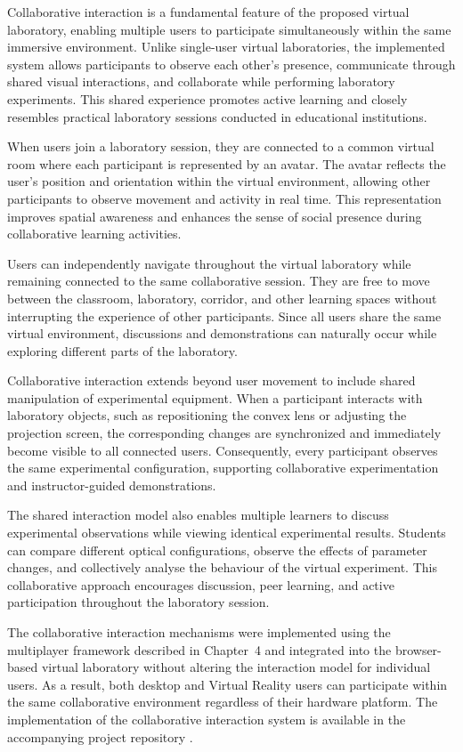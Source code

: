 Collaborative interaction is a fundamental feature of the proposed virtual laboratory, enabling multiple users to participate simultaneously within the same immersive environment. Unlike single-user virtual laboratories, the implemented system allows participants to observe each other's presence, communicate through shared visual interactions, and collaborate while performing laboratory experiments. This shared experience promotes active learning and closely resembles practical laboratory sessions conducted in educational institutions.

When users join a laboratory session, they are connected to a common virtual room where each participant is represented by an avatar. The avatar reflects the user's position and orientation within the virtual environment, allowing other participants to observe movement and activity in real time. This representation improves spatial awareness and enhances the sense of social presence during collaborative learning activities.

Users can independently navigate throughout the virtual laboratory while remaining connected to the same collaborative session. They are free to move between the classroom, laboratory, corridor, and other learning spaces without interrupting the experience of other participants. Since all users share the same virtual environment, discussions and demonstrations can naturally occur while exploring different parts of the laboratory.

Collaborative interaction extends beyond user movement to include shared manipulation of experimental equipment. When a participant interacts with laboratory objects, such as repositioning the convex lens or adjusting the projection screen, the corresponding changes are synchronized and immediately become visible to all connected users. Consequently, every participant observes the same experimental configuration, supporting collaborative experimentation and instructor-guided demonstrations.

The shared interaction model also enables multiple learners to discuss experimental observations while viewing identical experimental results. Students can compare different optical configurations, observe the effects of parameter changes, and collectively analyse the behaviour of the virtual experiment. This collaborative approach encourages discussion, peer learning, and active participation throughout the laboratory session.

The collaborative interaction mechanisms were implemented using the multiplayer framework described in Chapter~4 and integrated into the browser-based virtual laboratory without altering the interaction model for individual users. As a result, both desktop and Virtual Reality users can participate within the same collaborative environment regardless of their hardware platform. The implementation of the collaborative interaction system is available in the accompanying project repository \cite{thesisRepo}.

